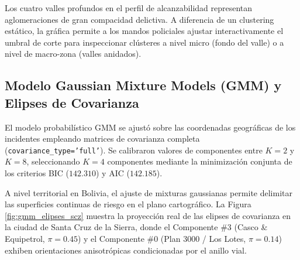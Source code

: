 \begin{interpretacionbox}
Los cuatro valles profundos en el perfil de alcanzabilidad representan aglomeraciones de gran compacidad delictiva. A diferencia de un clustering estático, la gráfica permite a los mandos policiales ajustar interactivamente el umbral de corte para inspeccionar clústeres a nivel micro (fondo del valle) o a nivel de macro-zona (valles anidados).
\end{interpretacionbox}

\subsection{Modelo Gaussian Mixture Models (GMM) y Elipses de Covarianza}

El modelo probabilístico GMM se ajustó sobre las coordenadas geográficas de los incidentes empleando matrices de covarianza completa (\texttt{covariance\_type='full'}). Se calibraron valores de componentes entre $K=2$ y $K=8$, seleccionando $K=4$ componentes mediante la minimización conjunta de los criterios BIC ($142.310$) y AIC ($142.185$).

\begin{table}[htbp]
\centering
\small
{}
\caption{Parámetros estimados por el algoritmo EM para las cuatro mixturas gaussianas.}
\label{tab:gmm_parametros}
\end{table}

A nivel territorial en Bolivia, el ajuste de mixturas gaussianas permite delimitar las superficies continuas de riesgo en el plano cartográfico. La Figura \ref{fig:gmm_elipses_scz} muestra la proyección real de las elipses de covarianza en la ciudad de Santa Cruz de la Sierra, donde el Componente \#3 (Casco \& Equipetrol, $\pi=0.45$) y el Componente \#0 (Plan 3000 / Los Lotes, $\pi=0.14$) exhiben orientaciones anisotrópicas condicionadas por el anillo vial.

